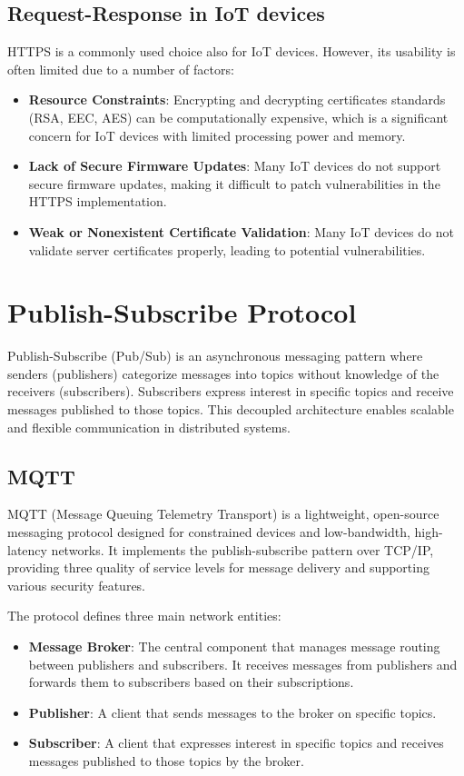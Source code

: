 \subsection{Request-Response in IoT devices}
HTTPS is a commonly used choice also for IoT devices. However, its usability is often limited due to a number of factors:
\begin{itemize}
    \item \textbf{Resource Constraints\cite{mazhar2023iotsecurity}}: Encrypting and decrypting certificates standards (RSA, EEC, AES) can be computationally expensive, which is a significant concern for IoT devices with limited processing power and memory.
    \item \textbf{Lack of Secure Firmware Updates\cite{cyberark2024iot}}: Many IoT devices do not support secure firmware updates, making it difficult to patch vulnerabilities in the HTTPS implementation.
    \item \textbf{Weak or Nonexistent Certificate Validation\cite{bishopfox2020weakcertificates}}: Many IoT devices do not validate server certificates properly, leading to potential vulnerabilities.
\end{itemize}

\section{Publish-Subscribe Protocol}
Publish-Subscribe (Pub/Sub) is an asynchronous messaging pattern where senders (publishers) categorize messages into topics without knowledge of the receivers (subscribers). Subscribers express interest in specific topics and receive messages published to those topics. This decoupled architecture enables scalable and flexible communication in distributed systems.

\subsection{MQTT}
MQTT (Message Queuing Telemetry Transport) is a lightweight, open-source messaging protocol designed for constrained devices and low-bandwidth, high-latency networks. It implements the publish-subscribe pattern over TCP/IP, providing three quality of service levels for message delivery and supporting various security features.

The protocol defines three main network entities:
\begin{itemize}
    \item \textbf{Message Broker}: The central component that manages message routing between publishers and subscribers. It receives messages from publishers and forwards them to subscribers based on their subscriptions.
    \item \textbf{Publisher}: A client that sends messages to the broker on specific topics. 
    \item \textbf{Subscriber}: A client that expresses interest in specific topics and receives messages published to those topics by the broker.
\end{itemize}

